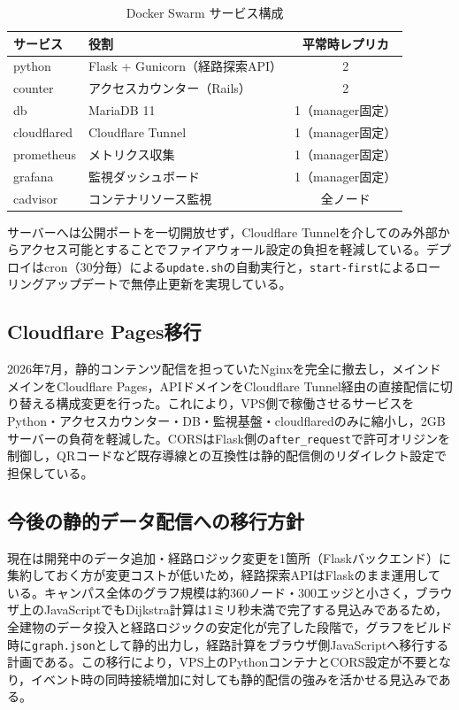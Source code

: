 \documentclass[a4paper,10.5pt]{ltjsarticle}
\begin{document}
\begin{table}[h]
\centering
\small
\caption{Docker Swarm サービス構成}
\label{tab:swarm}
\begin{tabular}{llc}
\toprule
サービス & 役割 & 平常時レプリカ \\
\midrule
python & Flask + Gunicorn（経路探索API） & 2 \\
counter & アクセスカウンター（Rails） & 2 \\
db & MariaDB 11 & 1（manager固定） \\
cloudflared & Cloudflare Tunnel & 1（manager固定） \\
prometheus & メトリクス収集 & 1（manager固定） \\
grafana & 監視ダッシュボード & 1（manager固定） \\
cadvisor & コンテナリソース監視 & 全ノード \\
\bottomrule
\end{tabular}
\end{table}

サーバーへは公開ポートを一切開放せず，Cloudflare Tunnelを介してのみ外部からアクセス可能とすることでファイアウォール設定の負担を軽減している。デプロイはcron（30分毎）による\texttt{update.sh}の自動実行と，\texttt{start-first}によるローリングアップデートで無停止更新を実現している。

\subsection{Cloudflare Pages移行}

2026年7月，静的コンテンツ配信を担っていたNginxを完全に撤去し，メインドメインをCloudflare Pages，APIドメインをCloudflare Tunnel経由の直接配信に切り替える構成変更を行った。これにより，VPS側で稼働させるサービスをPython・アクセスカウンター・DB・監視基盤・cloudflaredのみに縮小し，2GBサーバーの負荷を軽減した。CORSはFlask側の\texttt{after\_request}で許可オリジンを制御し，QRコードなど既存導線との互換性は静的配信側のリダイレクト設定で担保している。

\subsection{今後の静的データ配信への移行方針}

現在は開発中のデータ追加・経路ロジック変更を1箇所（Flaskバックエンド）に集約しておく方が変更コストが低いため，経路探索APIはFlaskのまま運用している。キャンパス全体のグラフ規模は約360ノード・300エッジと小さく，ブラウザ上のJavaScriptでもDijkstra計算は1ミリ秒未満で完了する見込みであるため，全建物のデータ投入と経路ロジックの安定化が完了した段階で，グラフをビルド時に\texttt{graph.json}として静的出力し，経路計算をブラウザ側JavaScriptへ移行する計画である。この移行により，VPS上のPythonコンテナとCORS設定が不要となり，イベント時の同時接続増加に対しても静的配信の強みを活かせる見込みである。
\end{document}
